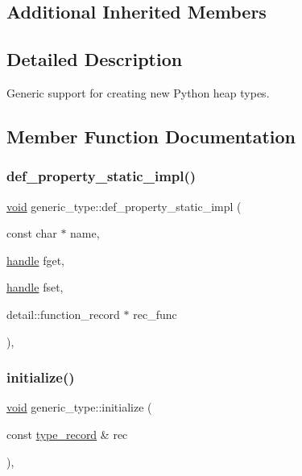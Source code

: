 \subsection*{Additional Inherited Members}


\subsection{Detailed Description}
Generic support for creating new Python heap types. 

\subsection{Member Function Documentation}
\mbox{\label{classgeneric__type_af4b8e335e3a6f25b38c522c2c4f4c692}} 
\subsubsection{\texorpdfstring{def\_property\_static\_impl()}{def\_property\_static\_impl()}}
{\footnotesize\ttfamily \mbox{\hyperlink{_s_d_l__opengles2__gl2ext_8h_ae5d8fa23ad07c48bb609509eae494c95}{void}} generic\+\_\+type\+::def\+\_\+property\+\_\+static\+\_\+impl (\begin{DoxyParamCaption}\item[{const char $\ast$}]{name,  }\item[{\mbox{\hyperlink{classhandle}{handle}}}]{fget,  }\item[{\mbox{\hyperlink{classhandle}{handle}}}]{fset,  }\item[{detail\+::function\+\_\+record $\ast$}]{rec\+\_\+func }\end{DoxyParamCaption})\hspace{0.3cm}{\ttfamily [inline]}, {\ttfamily [protected]}}

\mbox{\label{classgeneric__type_a0eaa0586a2e56b3e69d296572ca7091e}} 
\subsubsection{\texorpdfstring{initialize()}{initialize()}}
{\footnotesize\ttfamily \mbox{\hyperlink{_s_d_l__opengles2__gl2ext_8h_ae5d8fa23ad07c48bb609509eae494c95}{void}} generic\+\_\+type\+::initialize (\begin{DoxyParamCaption}\item[{const \mbox{\hyperlink{structtype__record}{type\+\_\+record}} \&}]{rec }\end{DoxyParamCaption})\hspace{0.3cm}{\ttfamily [inline]}, {\ttfamily [protected]}}

